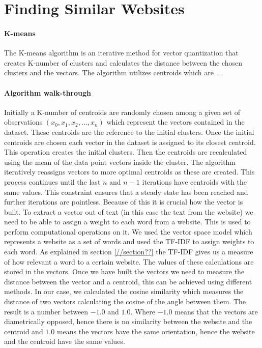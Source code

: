 \section{Finding Similar Websites}
\paragraph{K-means}
The K-means algorithm is an iterative method for vector quantization that creates K-number of clusters and calculates the distance between the chosen clusters and the vectors. 
The algorithm utilizes centroids which are ... \\
\paragraph{Algorithm walk-through}
Initially a K-number of centroids are randomly chosen among a given set of observations $(x_0,x_1,x_2,...,x_n)$ which represent the vectors contained in the dataset. These centroids are the reference to the initial clusters. Once the initial centroids are chosen each vector in the dataset is assigned to its closest centroid. This operation creates the initial clusters. Then the centroids are recalculated using the mean of the data point vectors inside the cluster. 
The algorithm iteratively reassigns vectors to more optimal centroids as these are created.
This process continues until the last $n$ and $n-1$ iterations have centroids with the same values. 
This constraint ensures that a steady state has been reached and further iterations are pointless.
Because of this it is crucial how the vector is built. To extract a vector out of text (in this case the text from the website) we need to be able to assign a weight to each word from a website. This is used to perform computational operations on it. We used the vector space model which represents a website as a set of words and used the TF-IDF to assign weights to each word. As explained in section \ref{//section??} the TF-IDF gives us a measure of how  relevant a word to a certain website. The values of these calculations are stored in the vectors.
Once we have built the vectors we need to measure the distance between the vector and a centroid, this can be achieved using different methods. In our case, we calculated the cosine similarity which measures the distance of two vectors calculating the cosine of the angle between them. The result is a number between $-1.0$ and $1.0$. Where $-1.0$ means that the vectors are diametrically opposed, hence there is no similarity between the website and the centroid and $1.0$ means the vectors have the same orientation, hence the website and the centroid have the same values.
